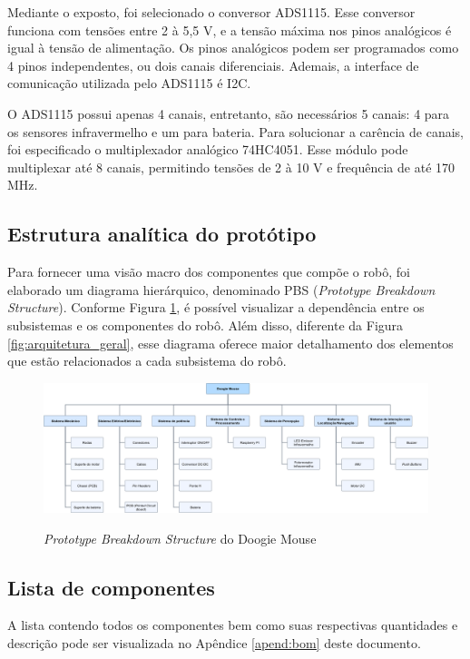 Mediante o exposto, foi selecionado o conversor ADS1115. Esse conversor funciona com tensões entre 2 à 5,5 V, e a tensão máxima nos pinos analógicos é igual à tensão de alimentação. Os pinos analógicos podem ser programados como 4 pinos independentes, ou dois canais diferenciais. Ademais, a interface de comunicação utilizada pelo ADS1115 é I2C.

O ADS1115 possui apenas 4 canais, entretanto, são necessários 5 canais: 4 para os sensores infravermelho e um para bateria. Para solucionar a carência de canais, foi especificado o multiplexador analógico 74HC4051. Esse módulo pode multiplexar até 8 canais, permitindo tensões de 2 à 10 V e frequência de até 170 MHz.

\subsection{Estrutura analítica do protótipo}
\label{ssec:pbs}
Para fornecer uma visão macro dos componentes que compõe o robô, foi elaborado um diagrama hierárquico, denominado PBS (\textit{Prototype Breakdown Structure}). Conforme Figura \ref{fig:pbs}, é possível visualizar a dependência entre os subsistemas e os componentes do robô. Além disso, diferente da Figura \ref{fig:arquitetura_geral}, esse diagrama oferece maior detalhamento dos elementos que estão relacionados a cada subsistema do robô.

\begin{figure}[H]
	\centering
	\caption{\textit{Prototype Breakdown Structure} do Doogie Mouse}
	\includegraphics[width=1\textwidth]
	{Figures/prototype_breakdown_structure}
	\label{fig:pbs}
\end{figure}

\subsection{Lista de componentes}
\label{ssec:bom}
A lista contendo todos os componentes bem como suas respectivas quantidades e descrição pode ser visualizada no Apêndice \ref{apend:bom} deste documento.

